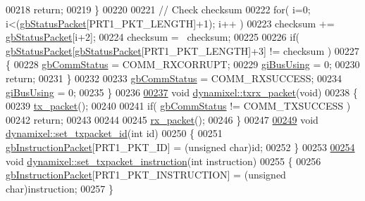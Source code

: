 \begin{DoxyCode}
00218         \textcolor{keywordflow}{return};
00219     \}
00220     
00221     \textcolor{comment}{// Check checksum}
00222     \textcolor{keywordflow}{for}( i=0; i<(\hyperlink{a00003_aa57c86d3bbbeaf5c9d4f6bd00376b04f}{gbStatusPacket}[PRT1\_PKT\_LENGTH]+1); i++ )
00223         checksum += \hyperlink{a00003_aa57c86d3bbbeaf5c9d4f6bd00376b04f}{gbStatusPacket}[i+2];
00224     checksum = ~checksum;
00225 
00226     \textcolor{keywordflow}{if}( \hyperlink{a00003_aa57c86d3bbbeaf5c9d4f6bd00376b04f}{gbStatusPacket}[\hyperlink{a00003_aa57c86d3bbbeaf5c9d4f6bd00376b04f}{gbStatusPacket}[PRT1\_PKT\_LENGTH]+3] != checksum )
00227     \{
00228         \hyperlink{a00003_a5b603f6bed7ccc595f1f50bd6a6ebbfc}{gbCommStatus} = COMM\_RXCORRUPT;
00229         \hyperlink{a00003_ad10e0e49f5fef04bf789a89c14cc470a}{giBusUsing} = 0;
00230         \textcolor{keywordflow}{return};
00231     \}
00232     
00233     \hyperlink{a00003_a5b603f6bed7ccc595f1f50bd6a6ebbfc}{gbCommStatus} = COMM\_RXSUCCESS;
00234     \hyperlink{a00003_ad10e0e49f5fef04bf789a89c14cc470a}{giBusUsing} = 0;
00235 \}
00236 
\hypertarget{a00012_source_l00237}{}\hyperlink{a00003_aebfc569c6b1eb0b98f8c385f0f921fc0}{00237} \textcolor{keywordtype}{void} \hyperlink{a00003_aebfc569c6b1eb0b98f8c385f0f921fc0}{dynamixel::txrx\_packet}(\textcolor{keywordtype}{void})
00238 \{
00239     \hyperlink{a00003_a479187cd8940c16dd4374eb5be22b888}{tx\_packet}();
00240 
00241     \textcolor{keywordflow}{if}( \hyperlink{a00003_a5b603f6bed7ccc595f1f50bd6a6ebbfc}{gbCommStatus} != COMM\_TXSUCCESS )
00242         \textcolor{keywordflow}{return}; 
00243     
00244     
00245     \hyperlink{a00003_aa26d2d2dff768563a1cb1480aa061608}{rx\_packet}();
00246 \}
00247 
\hypertarget{a00012_source_l00249}{}\hyperlink{a00003_a84e24c72c3e5be866f8b28c2e5bd1d95}{00249} \textcolor{keywordtype}{void} \hyperlink{a00003_a84e24c72c3e5be866f8b28c2e5bd1d95}{dynamixel::set\_txpacket\_id}(\textcolor{keywordtype}{int} \textcolor{keywordtype}{id})
00250 \{
00251     \hyperlink{a00003_afd94dcf01b8e96298727776e222de722}{gbInstructionPacket}[PRT1\_PKT\_ID] = (\textcolor{keywordtype}{unsigned} char)\textcolor{keywordtype}{id};
00252 \}
00253 
\hypertarget{a00012_source_l00254}{}\hyperlink{a00003_a209a43f983f214323b6f0a627d5e8c13}{00254} \textcolor{keywordtype}{void} \hyperlink{a00003_a209a43f983f214323b6f0a627d5e8c13}{dynamixel::set\_txpacket\_instruction}(\textcolor{keywordtype}{int} instruction)
00255 \{
00256     \hyperlink{a00003_afd94dcf01b8e96298727776e222de722}{gbInstructionPacket}[PRT1\_PKT\_INSTRUCTION] = (\textcolor{keywordtype}{unsigned} char)instruction;
00257 \}

\end{DoxyCode}

